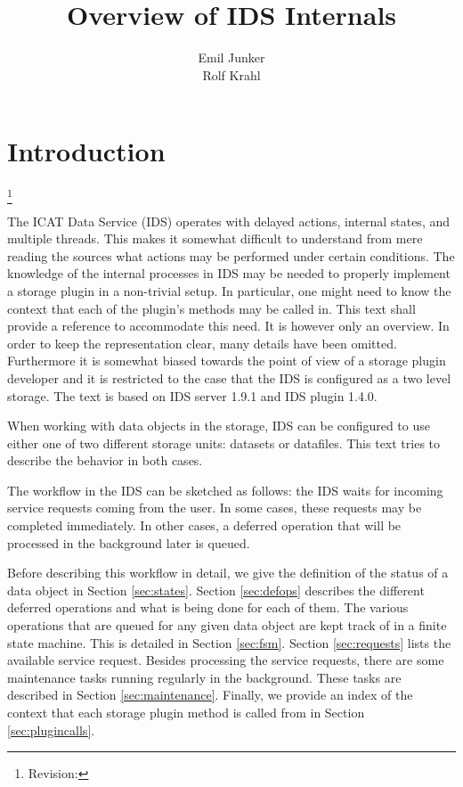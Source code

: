 \documentclass[paper=a4]{scrartcl}
\title{Overview of IDS Internals}
\author{Emil Junker \\ Rolf Krahl}
\newcommand{\revhint}{%
  \begingroup%
  \let\thefootnote\relax%
  \footnote{Revision: }%
  \addtocounter{footnote}{-1}%
  \endgroup%
}
\begin{document}
\maketitle

\section{Introduction}

\revhint{}%
The ICAT Data Service (IDS) operates with delayed actions, internal
states, and multiple threads.  This makes it somewhat difficult to
understand from mere reading the sources what actions may be performed
under certain conditions.  The knowledge of the internal processes in
IDS may be needed to properly implement a storage plugin in a
non-trivial setup.  In particular, one might need to know the context
that each of the plugin's methods may be called in.  This text shall
provide a reference to accommodate this need.  It is however only an
overview.  In order to keep the representation clear, many details
have been omitted.  Furthermore it is somewhat biased towards the
point of view of a storage plugin developer and it is restricted to
the case that the IDS is configured as a two level storage.  The text
is based on IDS server 1.9.1 and IDS plugin 1.4.0.

When working with data objects in the storage, IDS can be configured
to use either one of two different storage units: datasets or
datafiles.  This text tries to describe the behavior in both cases.

The workflow in the IDS can be sketched as follows: the IDS waits for
incoming service requests coming from the user.  In some cases, these
requests may be completed immediately.  In other cases, a deferred
operation that will be processed in the background later is queued.

Before describing this workflow in detail, we give the definition of
the status of a data object in Section \ref{sec:states}.  Section
\ref{sec:defops} describes the different deferred operations and what
is being done for each of them.  The various operations that are
queued for any given data object are kept track of in a finite state
machine.  This is detailed in Section \ref{sec:fsm}.  Section
\ref{sec:requests} lists the available service request.  Besides
processing the service requests, there are some maintenance tasks
running regularly in the background.  These tasks are described in
Section \ref{sec:maintenance}.  Finally, we provide an index of the
context that each storage plugin method is called from in Section
\ref{sec:plugincalls}.
\end{document}
